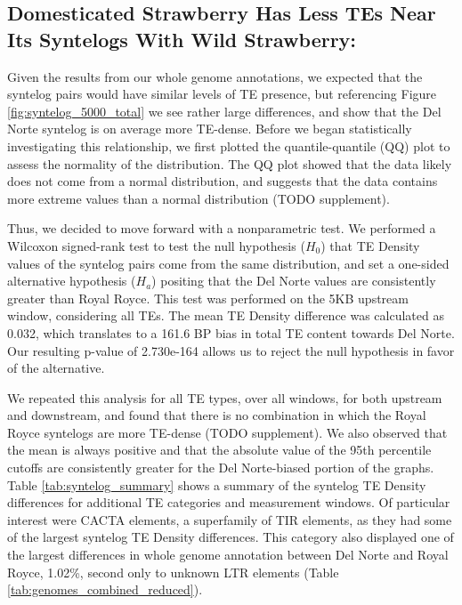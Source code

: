\documentclass[fleqn,10pt]{olplainarticle}
\begin{document}
\subsection{Domesticated Strawberry Has Less TEs Near Its Syntelogs With Wild Strawberry:}
Given the results from our whole genome annotations, we expected that the syntelog pairs would have similar levels of TE presence, but referencing Figure \ref{fig:syntelog_5000_total} we see rather large differences, and show that the Del Norte syntelog is on average more TE-dense.
Before we began statistically investigating this relationship, we first plotted the quantile-quantile (QQ) plot to assess the normality of the distribution.
The QQ plot showed that the data likely does not come from a normal distribution, and suggests that the data contains more extreme values than a normal distribution (TODO supplement).

Thus, we decided to move forward with a nonparametric test.
We performed a Wilcoxon signed-rank test to test the null hypothesis ($H_{0}$) that TE Density values of the syntelog pairs come from the same distribution, and set a one-sided alternative hypothesis ($H_{a}$) positing that the Del Norte values are consistently greater than Royal Royce.
This test was performed on the 5KB upstream window, considering all TEs.
The mean TE Density difference was calculated as 0.032, which translates to a 161.6 BP bias in total TE content towards Del Norte.
Our resulting p-value of 2.730e-164 allows us to reject the null hypothesis in favor of the alternative.

We repeated this analysis for all TE types, over all windows, for both upstream and downstream, and found that there is no combination in which the Royal Royce syntelogs are more TE-dense (TODO supplement).
We also observed that the mean is always positive and that the absolute value of the 95th percentile cutoffs are consistently greater for the Del Norte-biased portion of the graphs.
Table \ref{tab:syntelog_summary} shows a summary of the syntelog TE Density differences for additional TE categories and measurement windows.
Of particular interest were CACTA elements, a superfamily of TIR elements, as they had some of the largest syntelog TE Density differences.
This category also displayed one of the largest differences in whole genome annotation between Del Norte and Royal Royce, 1.02\%, second only to unknown LTR elements (Table \ref{tab:genomes_combined_reduced}).
\end{document}
